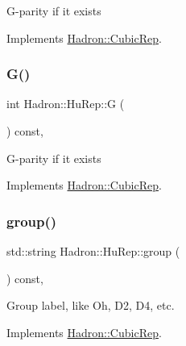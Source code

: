 G-\/parity if it exists 

Implements \mbox{\hyperlink{structHadron_1_1CubicRep_a52104e43266d1614c00bbd1c3b395458}{Hadron\+::\+Cubic\+Rep}}.

\mbox{\label{structHadron_1_1HuRep_a6486cf33fe424a2226d6fbb2dd7b7d3c}} 
\subsubsection{\texorpdfstring{G()}{G()}\hspace{0.1cm}{\footnotesize\ttfamily [3/3]}}
{\footnotesize\ttfamily int Hadron\+::\+Hu\+Rep\+::G (\begin{DoxyParamCaption}{ }\end{DoxyParamCaption}) const\hspace{0.3cm}{\ttfamily [inline]}, {\ttfamily [virtual]}}

G-\/parity if it exists 

Implements \mbox{\hyperlink{structHadron_1_1CubicRep_a52104e43266d1614c00bbd1c3b395458}{Hadron\+::\+Cubic\+Rep}}.

\mbox{\label{structHadron_1_1HuRep_ace31fc18f9795a65589ec7014517ac33}} 
\subsubsection{\texorpdfstring{group()}{group()}\hspace{0.1cm}{\footnotesize\ttfamily [1/3]}}
{\footnotesize\ttfamily std\+::string Hadron\+::\+Hu\+Rep\+::group (\begin{DoxyParamCaption}{ }\end{DoxyParamCaption}) const\hspace{0.3cm}{\ttfamily [inline]}, {\ttfamily [virtual]}}

Group label, like Oh, D2, D4, etc. 

Implements \mbox{\hyperlink{structHadron_1_1CubicRep_a0748f11ec87f387062c8e8981339a29c}{Hadron\+::\+Cubic\+Rep}}.

\mbox{\label{structHadron_1_1HuRep_ace31fc18f9795a65589ec7014517ac33}} 
